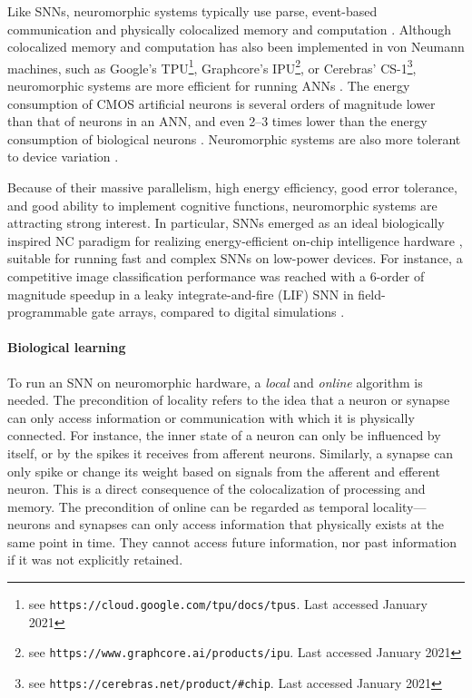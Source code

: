 Like SNNs, neuromorphic systems typically use parse, event-based communication and physically colocalized memory and computation \citep{sterling2015principles,neftci2018data}.
Although colocalized memory and computation has also been implemented in von Neumann machines, such as Google's TPU\footnote{see \texttt{https://cloud.google.com/tpu/docs/tpus}. Last accessed January 2021}, Graphcore's IPU\footnote{see \texttt{https://www.graphcore.ai/products/ipu}. Last accessed January 2021}, or Cerebras' CS-1\footnote{see \texttt{https://cerebras.net/product/\#chip}. Last accessed January 2021}, neuromorphic systems are more efficient for running ANNs \citep{merolla2014million,rajendran2019low}.
The energy consumption of CMOS artificial neurons is several orders of magnitude lower than that of neurons in an ANN, and even 2--3 times lower than the energy consumption of biological neurons \citep{elbez2020progressive}.
Neuromorphic systems are also more tolerant to device variation \citep{yu2013low}.

Because of their massive parallelism, high energy efficiency, good error tolerance, and good ability to implement cognitive functions, neuromorphic systems are attracting strong interest.
In particular, SNNs emerged as an ideal biologically inspired NC paradigm for realizing energy-efficient on-chip intelligence hardware \citep{merolla2014million,davies2018loihi}, suitable for running fast and complex SNNs on low-power devices.
For instance, a competitive image classification performance was reached with a 6-order of magnitude speedup in a leaky integrate-and-fire (LIF) SNN in field-programmable gate arrays, compared to digital simulations \citep{zhang2020low}.

\paragraph{Biological learning}
To run an SNN on neuromorphic hardware, a \emph{local} and \emph{online} algorithm is needed.
The precondition of locality refers to the idea that a neuron or synapse can only access information or communication with which it is physically connected.
For instance, the inner state of a neuron can only be influenced by itself, or by the spikes it receives from afferent neurons.
Similarly, a synapse can only spike or change its weight based on signals from the afferent and efferent neuron.
This is a direct consequence of the colocalization of processing and memory.
The precondition of online can be regarded as temporal locality---neurons and synapses can only access information that physically exists at the same point in time.
They cannot access future information, nor past information if it was not explicitly retained.

